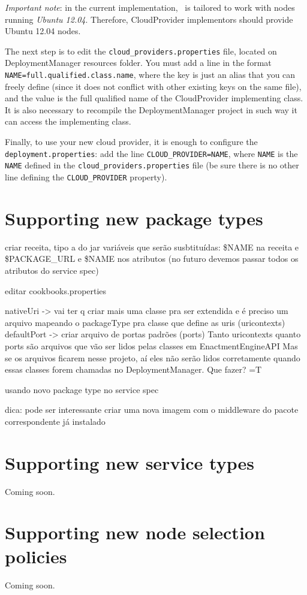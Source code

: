 \emph{Important note}: in the current implementation, \ee\ is tailored to work with nodes running \emph{Ubuntu 12.04}. Therefore, \textsf{CloudProvider} implementors should provide Ubuntu 12.04 nodes. 

The next step is to edit the \texttt{cloud\_providers.properties} file, located on DeploymentManager resources folder. You must add a line in the format \verb!NAME=full.qualified.class.name!, where the key is just an alias that you can freely define (since it does not conflict with other existing keys on the same file), and the value is the full qualified name of the \textsf{CloudProvider} implementing class. It is also necessary to recompile the DeploymentManager project in such way it can access the implementing class.

Finally, to use your new cloud provider, it is enough to configure the \texttt{deployment.properties}: add the line \verb!CLOUD_PROVIDER=NAME!, where \verb!NAME! is the \verb!NAME! defined in the \texttt{cloud\_providers.properties} file (be sure there is no other line defining the \verb!CLOUD_PROVIDER! property).

\section{Supporting new package types}

criar receita, tipo a do jar
variáveis que serão susbtituídas:
\$NAME na receita
e \$PACKAGE\_URL e \$NAME nos atributos
(no futuro devemos passar todos os atributos do service spec)

editar cookbooks.properties

nativeUri -> vai ter q criar mais uma classe pra ser extendida
e é preciso um arquivo mapeando o packageType pra classe que define as uris (uricontexts)
defaultPort -> criar arquivo de portas padrões (ports)
Tanto uricontexts quanto ports são arquivos que vão ser lidos pelas classes em EnactmentEngineAPI
Mas se os arquivos ficarem nesse projeto, aí eles não serão lidos corretamente quando 
essas classes forem chamadas no DeploymentManager.
Que fazer? =T

usando novo package type no service spec

dica: pode ser interessante criar uma nova imagem
com o middleware do pacote correspondente já instalado


\section{Supporting new service types}

Coming soon.

\section{Supporting new node selection policies}

Coming soon.
